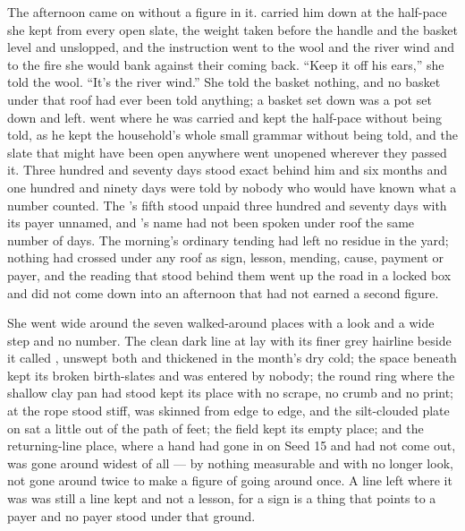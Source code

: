 The afternoon came on without a figure in it.  carried him down at the half-pace she kept from every open slate, the weight taken before the handle and the basket level and unslopped, and the instruction went to the wool and the river wind and to the fire she would bank against their coming back. “Keep it off his ears,” she told the wool. “It's the river wind.” She told the basket nothing, and no basket under that roof had ever been told anything; a basket set down was a pot set down and left.  went where he was carried and kept the half-pace without being told, as he kept the household's whole small grammar without being told, and the slate that might have been open anywhere went unopened wherever they passed it. Three hundred and seventy days stood exact behind him and six months and one hundred and ninety days were told by nobody who would have known what a number counted. The 's fifth stood unpaid three hundred and seventy days with its payer unnamed, and 's name had not been spoken under  roof the same number of days. The morning's ordinary tending had left no residue in the yard; nothing had crossed under any roof as sign, lesson, mending, cause, payment or payer, and the  reading that stood behind them went up the road in a locked box and did not come down into an afternoon that had not earned a second figure.

She went wide around the seven walked-around places with a look and a wide step and no number. The clean dark line at  lay with its finer grey hairline beside it called , unswept both and thickened in the month's dry cold; the space beneath  kept its broken birth-slates and was entered by nobody; the round ring where the shallow clay pan had stood kept its place with no scrape, no crumb and no print; at  the rope stood stiff,  was skinned from edge to edge, and the silt-clouded plate on  sat a little out of the path of feet; the field kept its empty place; and the returning-line place, where a hand had gone in on Seed 15 and had not come out, was gone around widest of all --- by nothing measurable and with no longer look, not gone around twice to make a figure of going around once. A line left where it was was still a line kept and not a lesson, for a sign is a thing that points to a payer and no payer stood under that ground.


